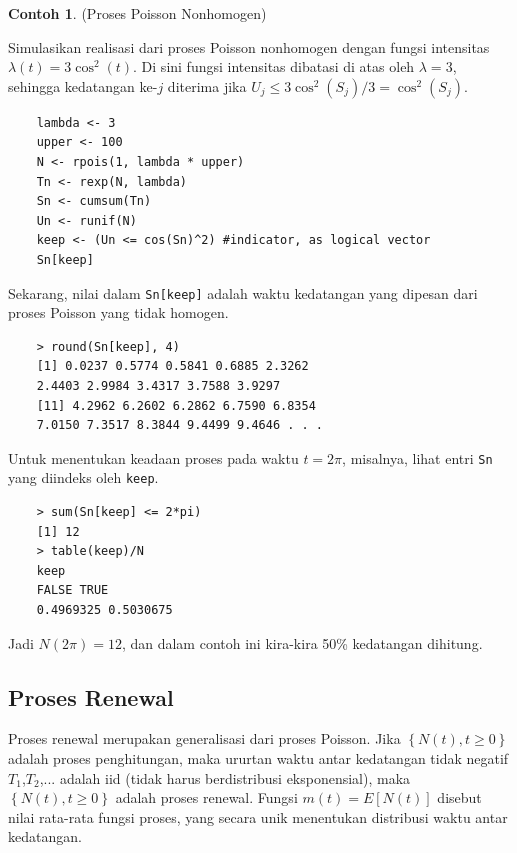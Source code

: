 \documentclass[a4paper,12pt]{article}
\theoremstyle{definition}
\newtheorem{example}{Contoh}[section]
\begin{document}
\begin{example} \label{C3} (Proses Poisson Nonhomogen)

Simulasikan realisasi dari proses Poisson nonhomogen dengan fungsi intensitas $\lambda (t) = 3 \cos^2 (t)$. Di sini fungsi intensitas dibatasi di atas oleh $\lambda = 3$, sehingga kedatangan ke-$j$ diterima jika $U_j \leq 3 \cos^2 (S_j)/3 = \cos^2 (S_j)$.
    
    \begin{lstlisting}
    lambda <- 3
    upper <- 100
    N <- rpois(1, lambda * upper)
    Tn <- rexp(N, lambda)
    Sn <- cumsum(Tn)
    Un <- runif(N)
    keep <- (Un <= cos(Sn)^2) #indicator, as logical vector
    Sn[keep]    
    \end{lstlisting}

Sekarang, nilai dalam \texttt{Sn[keep]} adalah waktu kedatangan yang dipesan dari proses Poisson yang tidak homogen.

    \begin{lstlisting}
    > round(Sn[keep], 4)
    [1] 0.0237 0.5774 0.5841 0.6885 2.3262
    2.4403 2.9984 3.4317 3.7588 3.9297
    [11] 4.2962 6.2602 6.2862 6.7590 6.8354
    7.0150 7.3517 8.3844 9.4499 9.4646 . . .
    \end{lstlisting}
    
Untuk menentukan keadaan proses pada waktu $t = 2 \pi$, misalnya, lihat entri \texttt{Sn} yang diindeks oleh \texttt{keep}.

    \begin{lstlisting}
    > sum(Sn[keep] <= 2*pi)
    [1] 12
    > table(keep)/N
    keep
    FALSE TRUE
    0.4969325 0.5030675
    \end{lstlisting}
    
Jadi $N(2 \pi) = 12$, dan dalam contoh ini kira-kira 50\% kedatangan dihitung.
\end{example}





\subsection{Proses Renewal} %
Proses renewal merupakan generalisasi dari proses Poisson. Jika $\left \{ N\left ( t \right ),t\geq 0 \right \}$ adalah proses penghitungan, maka ururtan waktu antar kedatangan tidak negatif $T_1$,$T_2$,... adalah iid (tidak harus berdistribusi eksponensial), maka $\left \{ N\left ( t \right ),t\geq 0 \right \}$ adalah proses renewal. Fungsi $m\left ( t \right )=E\left [ N\left ( t \right ) \right ]$ disebut nilai rata-rata fungsi proses, yang secara unik menentukan distribusi waktu antar kedatangan.
\end{document}
